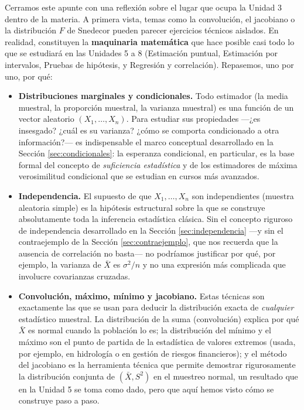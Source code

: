\documentclass[11pt,a4paper]{article}
\theoremstyle{plain}
\theoremstyle{definition}
\theoremstyle{remark}
\begin{document}
Cerramos este apunte con una reflexión sobre el lugar que ocupa la Unidad 3 dentro de la materia. A primera vista, temas como la convolución, el jacobiano o la distribución $F$ de Snedecor pueden parecer ejercicios técnicos aislados. En realidad, constituyen la \textbf{maquinaria matemática} que hace posible casi todo lo que se estudiará en las Unidades 5 a 8 (Estimación puntual, Estimación por intervalos, Pruebas de hipótesis, y Regresión y correlación). Repasemos, uno por uno, por qué:

\begin{itemize}
\item \textbf{Distribuciones marginales y condicionales.} Todo estimador (la media muestral, la proporción muestral, la varianza muestral) es una función de un vector aleatorio $(X_1,\dots,X_n)$. Para estudiar sus propiedades —¿es insesgado? ¿cuál es su varianza? ¿cómo se comporta condicionado a otra información?— es indispensable el marco conceptual desarrollado en la Sección \ref{sec:condicionales}: la esperanza condicional, en particular, es la base formal del concepto de \emph{suficiencia estadística} y de los estimadores de máxima verosimilitud condicional que se estudian en cursos más avanzados.

\item \textbf{Independencia.} El supuesto de que $X_1,\dots,X_n$ son independientes (muestra aleatoria simple) es la hipótesis estructural sobre la que se construye absolutamente toda la inferencia estadística clásica. Sin el concepto riguroso de independencia desarrollado en la Sección \ref{sec:independencia} —y sin el contraejemplo de la Sección \ref{sec:contraejemplo}, que nos recuerda que la ausencia de correlación no basta— no podríamos justificar por qué, por ejemplo, la varianza de $\bar X$ es $\sigma^2/n$ y no una expresión más complicada que involucre covarianzas cruzadas.

\item \textbf{Convolución, máximo, mínimo y jacobiano.} Estas técnicas son exactamente las que se usan para deducir la distribución exacta de \emph{cualquier} estadístico muestral. La distribución de la suma (convolución) explica por qué $\bar X$ es normal cuando la población lo es; la distribución del mínimo y el máximo son el punto de partida de la estadística de valores extremos (usada, por ejemplo, en hidrología o en gestión de riesgos financieros); y el método del jacobiano es la herramienta técnica que permite demostrar rigurosamente la distribución conjunta de $(\bar X, S^2)$ en el muestreo normal, un resultado que en la Unidad 5 se toma como dado, pero que aquí hemos visto cómo se construye paso a paso.


\end{itemize}
\end{document}

